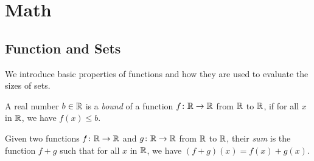 

\section{Math}



\subsection{Function and Sets}
We introduce basic properties of functions and how they are used to evaluate the sizes of sets. 

\begin{definition}
  A real number $b \in \mathbb{R}$ is a \emph{bound} of a 
  function $f\colon \mathbb{R}\to \mathbb{R}$ from $\mathbb{R}$ to $\mathbb{R}$, if for all $x$ in 
  $\mathbb{R}$, we have $f(x) \leq b$. 
\end{definition}


\begin{definition}
  Given two functions $f\colon  \mathbb{R}\to \mathbb{R}$ and $g\colon  \mathbb{R}\to \mathbb{R}$ from $\mathbb{R}$ to $\mathbb{R}$, their \emph{sum} is the function $f + g$ such 
  that for all $x$ in $\mathbb{R}$, we have $(f+g) (x) = f(x) + g(x)$.
\end{definition} 


